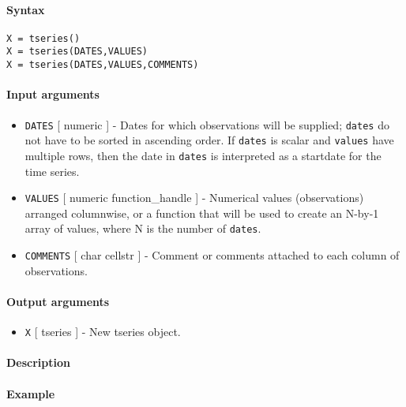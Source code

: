 


	\paragraph{Syntax}\label{syntax}

\begin{verbatim}
X = tseries()
X = tseries(DATES,VALUES)
X = tseries(DATES,VALUES,COMMENTS)
\end{verbatim}

\paragraph{Input arguments}\label{input-arguments}

\begin{itemize}
\item
  \texttt{DATES} {[} numeric {]} - Dates for which observations will be
  supplied; \texttt{dates} do not have to be sorted in ascending order.
  If \texttt{dates} is scalar and \texttt{values} have multiple rows,
  then the date in \texttt{dates} is interpreted as a startdate for the
  time series.
\item
  \texttt{VALUES} {[} numeric \textbar{} function\_handle {]} -
  Numerical values (observations) arranged columnwise, or a function
  that will be used to create an N-by-1 array of values, where N is the
  number of \texttt{dates}.
\item
  \texttt{COMMENTS} {[} char \textbar{} cellstr {]} - Comment or
  comments attached to each column of observations.
\end{itemize}

\paragraph{Output arguments}\label{output-arguments}

\begin{itemize}
\itemsep1pt\parskip0pt
\item
  \texttt{X} {[} tseries {]} - New tseries object.
\end{itemize}

\paragraph{Description}\label{description}

\paragraph{Example}\label{example}


